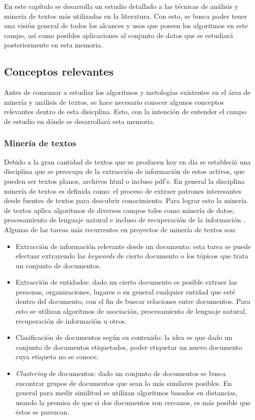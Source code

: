     En este capítulo se desarrolla un estudio detallado a las técnicas de análisis y minería de textos más utilizadas en la literatura. Con esto, se busca poder tener una visión general de todos los alcances y usos que poseen los algoritmos en este campo, así como posibles aplicaciones al conjunto de datos que se estudiará posteriormente en esta memoria.
\subsection{Conceptos relevantes}
    Antes de comenzar a estudiar los algoritmos y metologías existentes en el área de minería y análisis de textos, se hace necesario conocer algunos conceptos relevantes dentro de esta disicplina. Esto, con la intención de entender el campo de estudio en dónde se desarrollará esta memoria.
    
\subsubsection{Minería de textos}
    Debido a la gran cantidad de textos que se producen hoy en día se estableció una disciplina que se preocupa de la extracción de información de estos activos, que pueden ser textos planos, archivos html o incluso pdf's.
    En general la disciplina minería de textos es definida como: el proceso de extraer patrones interesantes desde fuentes de textos para descubrir conocimiento. Para lograr esto la minería de textos aplica algoritmos de diversos campos tales como minería de datos, procesamiento de lenguaje natural e incluso de recuperación de la información \cite{yehia2016text}.
    Algunas de las tareas más recurrentes en proyectos de minería de textos son: 
    \begin{itemize}
        \item Extracción de información relevante desde un documento: esta tarea se puede efectuar extrayendo las \textit{keywords} de cierto documento o los tópicos que trata un conjunto de documentos.
        \item Extracción de entidades: dado un cierto documento es posible extraer las personas, organizaciones, lugares  o en general cualquier entidad que esté dentro del documento, con el fin de buscar relaciones entre documentos. Para esto se utilizan algoritmos de asociación, procesamiento de lenguaje natural, recuperación de información u otros.
        \item Clasificación de documentos según su contenido: la idea es que dado un conjunto de documentos etiquetados, poder etiquetar un nuevo documento cuya etiqueta no se conoce.
        \item \textit{Clustering} de documentos: dado un conjunto de documentos se busca encontrar grupos de documentos que sean lo más similares posibles. En general para medir similitud se utilizan algoritmos basados en distancias, usando la premisa de que si dos documentos son cercanos, es más posible que éstos se parezcan.
    \end{itemize}
